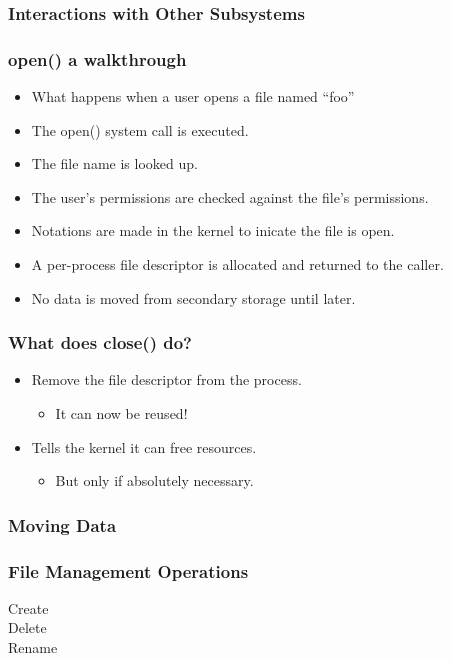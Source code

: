 \documentclass[pdftex]{beamer} %
\begin{document}
\begin{frame}
  \frametitle{Interactions with Other Subsystems}
  
\end{frame}

\begin{frame}
  \frametitle{open() a walkthrough}
  \begin{itemize}
  \item What happens when a user opens a file named ``foo''
  \item The open() system call is executed.
  \item The file name is looked up.
  \item The user's permissions are checked against the file's
    permissions.
  \item Notations are made in the kernel to inicate the file is open.
  \item A per-process file descriptor is allocated and returned to the
    caller.
  \item No data is moved from secondary storage until later.
  \end{itemize}
\end{frame}

\begin{frame}
  \frametitle{What does close() do?}
  \begin{itemize}
  \item Remove the file descriptor from the process.
    \begin{itemize}
    \item It can now be reused!
    \end{itemize}
  \item Tells the kernel it can free resources.
    \begin{itemize}
    \item But only if absolutely necessary.
    \end{itemize}
  \end{itemize}
\end{frame}

\begin{frame}
  \frametitle{Moving Data}
  
\end{frame}

\begin{frame}
  \frametitle{File Management Operations}
  \begin{description}
  \item[Create]
  \item[Delete]
  \item[Rename] 
  \end{description}
\end{frame}
\end{document}
